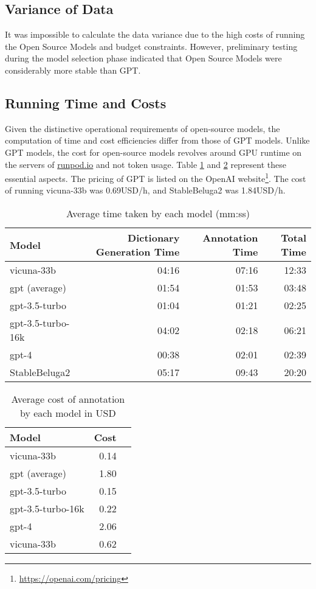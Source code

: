 \subsection{Variance of Data}
It was impossible to calculate the data variance due to the high costs of running the Open Source Models and budget constraints. However, preliminary testing during the model selection phase indicated that Open Source Models were considerably more stable than GPT.

\subsection{Running Time and Costs}
Given the distinctive operational requirements of open-source models, the computation of time and cost efficiencies differ from those of GPT models. Unlike GPT models, the cost for open-source models revolves around GPU runtime on the servers of \href{https://runpod.io}{runpod.io} and not token usage. Table \ref{tab:open-time} and \ref{tab:open-cost} represent these essential aspects. The pricing of GPT is listed on the OpenAI website\footnote{\url{https://openai.com/pricing}}. The cost of running vicuna-33b was 0.69USD/h, and StableBeluga2 was 1.84USD/h.

\begin{table}[htpb]
  \centering
  \begin{tabular}{lrrr}
    \hline
    Model & Dictionary Generation Time & Annotation Time & Total Time \\
    \hline
    vicuna-33b & 04:16 & 07:16 & 12:33 \\
    gpt (average) & 01:54 & 01:53 & 03:48 \\
    gpt-3.5-turbo & 01:04 & 01:21 & 02:25 \\
    gpt-3.5-turbo-16k & 04:02 & 02:18 & 06:21 \\
    gpt-4 & 00:38 & 02:01 & 02:39 \\
    StableBeluga2 & 05:17 & 09:43 & 20:20 \\
    \hline
  \end{tabular}
  \caption[Average time taken]{Average time taken by each model (mm:ss)}
  \label{tab:open-time}
\end{table}

\begin{table}[htpb]
  \centering
  \begin{tabular}{lrr}
    \hline
    Model & Cost \\
    \hline
    vicuna-33b & 0.14 \\
    gpt (average) & 1.80 \\
    gpt-3.5-turbo & 0.15 \\
    gpt-3.5-turbo-16k & 0.22 \\
    gpt-4 & 2.06 \\
    vicuna-33b & 0.62 \\
    \hline
  \end{tabular}
  \caption[Cost Analysis]{Average cost of annotation by each model in USD}
  \label{tab:open-cost}
\end{table}

